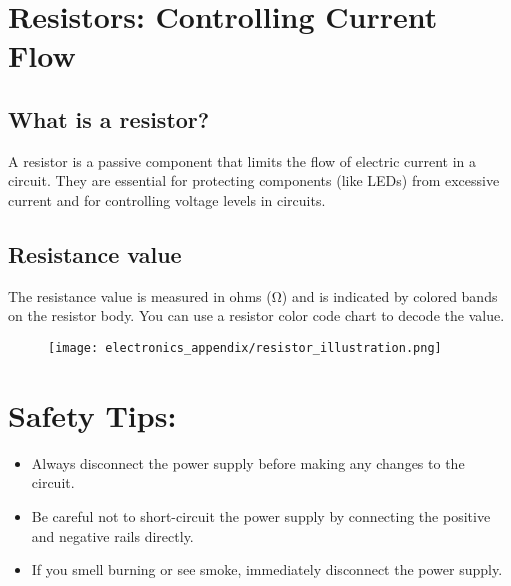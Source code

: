 \section{Resistors: Controlling Current Flow}
\subsection{What is a resistor?}
A resistor is a passive component that limits the flow of electric current in a circuit. They are
essential for protecting components (like LEDs) from excessive current and for controlling voltage
levels in circuits.

\subsection{Resistance value}
The resistance value is measured in ohms (\si{\ohm}) and is indicated by colored bands on the resistor body.
You can use a resistor color code chart to decode the value.

\begin{figure}[H]
\centering
    \texttt{[image: electronics\_appendix/resistor\_illustration.png]}
\end{figure}

\section{Safety Tips:}
\begin{itemize}
    \item Always disconnect the power supply before making any changes to the circuit.
    \item Be careful not to short-circuit the power supply by connecting the positive and negative rails directly.
    \item If you smell burning or see smoke, immediately disconnect the power supply.
\end{itemize}
